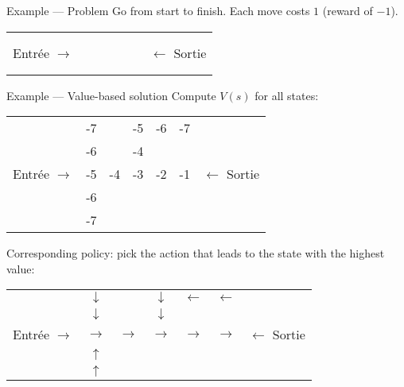 \begin{frame}{Example --- Problem}
  Go from start to finish. Each move costs $1$ (reward of $-1$).
  \begin{tabular}{c|c|c|c|c|c|c}
    \cline{2-6}
     & & \cellcolor{black} & & & & \\
    \cline{2-6}
     & & \cellcolor{black} & & \cellcolor{black} & \cellcolor{black} & \\
    \cline{2-6}
    Entrée $\rightarrow$ & \phantom{-5} & \phantom{-5} & \phantom{-5} & \phantom{-5} & \phantom{-5} & $\leftarrow$ Sortie \\
    \cline{2-6}
     & & \cellcolor{black} & \cellcolor{black} & \cellcolor{black} & \cellcolor{black} & \\
    \cline{2-6}
     & & \cellcolor{black} & \cellcolor{black} & \cellcolor{black} & \cellcolor{black} & \\
    \cline{2-6}
  \end{tabular}
\end{frame}

\begin{frame}{Example --- Value-based solution}
  Compute $V(s)$ for all states:

  \begin{tabular}{c|c|c|c|c|c|c}
    \cline{2-6}
      & -7 & \cellcolor{black} & -5 & -6 & -7 & \\
      \cline{2-6}
      & -6 & \cellcolor{black} & -4 & \cellcolor{black} & \cellcolor{black} & \\
      \cline{2-6}
      Entrée $\rightarrow$ & -5 & -4 & -3 & -2 & -1 & $\leftarrow$ Sortie \\
      \cline{2-6}
      & -6 & \cellcolor{black} & \cellcolor{black} & \cellcolor{black} & \cellcolor{black} & \\
      \cline{2-6}
      & -7 & \cellcolor{black} & \cellcolor{black} & \cellcolor{black} & \cellcolor{black} & \\
      \cline{2-6}
  \end{tabular}

  \pause

  Corresponding policy: pick the action that leads to the state with the highest value:

  \begin{tabular}{c|c|c|c|c|c|c}
    \cline{2-6}
      & $\downarrow$ & \cellcolor{black} & $\downarrow$ & $\leftarrow$ & $\leftarrow$ & \\
      \cline{2-6}
      & $\downarrow$ & \cellcolor{black} & $\downarrow$ & \cellcolor{black} & \cellcolor{black} & \\
      \cline{2-6}
      Entrée $\rightarrow$ & $\rightarrow$ & $\rightarrow$ & $\rightarrow$ & $\rightarrow$ & $\rightarrow$ & $\leftarrow$ Sortie \\
      \cline{2-6}
      & $\uparrow$ & \cellcolor{black} & \cellcolor{black} & \cellcolor{black} & \cellcolor{black} & \\
      \cline{2-6}
      & $\uparrow$ & \cellcolor{black} & \cellcolor{black} & \cellcolor{black} & \cellcolor{black} & \\
      \cline{2-6}
  \end{tabular}
\end{frame}


